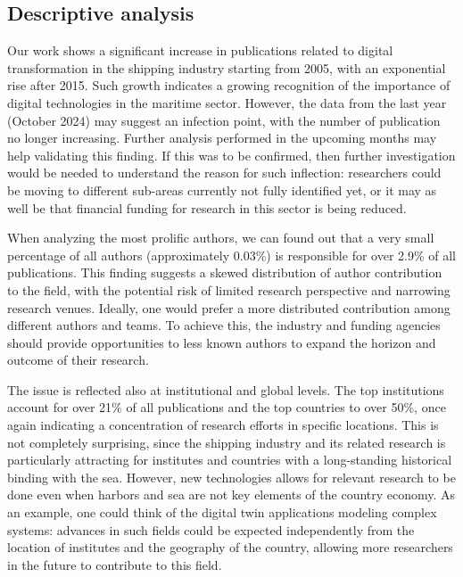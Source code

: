 \documentclass[a4paper, review, endfloat, authoryear]{elsarticle}
\begin{document}
	\subsection{Descriptive analysis}	
	Our work shows a significant increase in publications related to digital transformation in the shipping industry starting from 2005, with an exponential rise after 2015. Such growth indicates a growing recognition of the importance of digital technologies in the maritime sector. However, the data from the last year (October 2024) may suggest an infection point, with the number of publication no longer increasing. Further analysis performed in the upcoming months may help validating this finding. If this was to be confirmed, then further investigation would be needed to understand the reason for such inflection: researchers could be moving to different sub-areas currently not fully identified yet, or it may as well be that financial funding for research in this sector is being reduced.
	
	When analyzing the most prolific authors, we can found out that a very small percentage of all authors (approximately 0.03\%) is responsible for over 2.9\% of all publications. This finding suggests a skewed distribution of author contribution to the field, with the potential risk of limited research perspective and narrowing research venues. Ideally, one would prefer a more distributed contribution among different authors and teams. To achieve this, the industry and funding agencies should provide opportunities to less known authors to expand the horizon and outcome of their research.
	
	The issue is reflected also at institutional and global levels. The top institutions account for over 21\% of all publications and the top countries to over 50\%, once again indicating a concentration of research efforts in specific locations. This is not completely surprising, since the shipping industry and its related research is particularly attracting for institutes and countries with a long-standing historical binding with the sea. However, new technologies allows for relevant research to be done even when harbors and sea are not key elements of the country economy. As an example, one could think of the digital twin applications modeling complex systems: advances in such fields could be expected independently from the location of institutes and the geography of the country, allowing more researchers in the future to contribute to this field.
	
\end{document}
